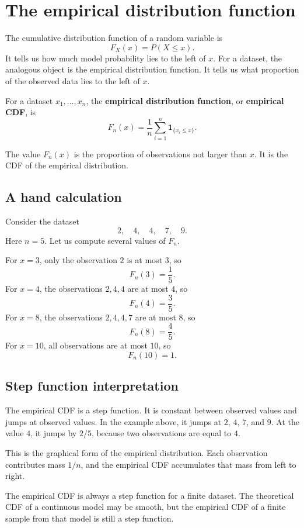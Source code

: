 \section{The empirical distribution function}

The cumulative distribution function of a random variable is
\[
F_X(x)=P(X\leq x).
\]
It tells us how much model probability lies to the left of \(x\). For a dataset,
the analogous object is the empirical distribution function. It tells us what
proportion of the observed data lies to the left of \(x\).

\begin{definitionbox}
For a dataset \(x_1,\ldots,x_n\), the \textbf{empirical distribution function},
or \textbf{empirical CDF}, is
\[
F_n(x)=\frac1n\sum_{i=1}^n\mathbf{1}_{\{x_i\leq x\}}.
\]
\end{definitionbox}

The value \(F_n(x)\) is the proportion of observations not larger than \(x\). It
is the CDF of the empirical distribution.

\subsection*{A hand calculation}

Consider the dataset
\[
2,\quad 4,\quad 4,\quad 7,\quad 9.
\]
Here \(n=5\). Let us compute several values of \(F_n\).

For \(x=3\), only the observation \(2\) is at most \(3\), so
\[
F_n(3)=\frac15.
\]
For \(x=4\), the observations \(2,4,4\) are at most \(4\), so
\[
F_n(4)=\frac35.
\]
For \(x=8\), the observations \(2,4,4,7\) are at most \(8\), so
\[
F_n(8)=\frac45.
\]
For \(x=10\), all observations are at most \(10\), so
\[
F_n(10)=1.
\]

\subsection*{Step function interpretation}

The empirical CDF is a step function. It is constant between observed values and
jumps at observed values. In the example above, it jumps at \(2\), \(4\), \(7\),
and \(9\). At the value \(4\), it jumps by \(2/5\), because two observations are
equal to \(4\).

This is the graphical form of the empirical distribution. Each observation
contributes mass \(1/n\), and the empirical CDF accumulates that mass from left
to right.

\begin{remarkbox}
The empirical CDF is always a step function for a finite dataset. The theoretical
CDF of a continuous model may be smooth, but the empirical CDF of a finite sample
from that model is still a step function.
\end{remarkbox}

